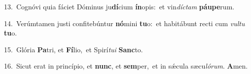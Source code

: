 {\numbfont\textcolor{\numbcolor}{13.}}~Cognóvi quia fáciet Dóminus ju\-\textbf{dí}\-cium \textbf{ín}\-opis:~\star et vin\-\textit{díc}\-\textit{tam} \textbf{páu}\-\textbf{pe}rum.\par
{\numbfont\textcolor{\numbcolor}{14.}}~Verúmtamen justi confitebúntur \textbf{nó}\-mini \textbf{tu}\-o:~\star et habitábunt recti cum \textit{vul}\-\textit{tu} \textbf{tu}\-o.\par
{\numbfont\textcolor{\numbcolor}{15.}}~Glória \textbf{Pa}\-tri, et \textbf{Fí}\-lio,~\star et Spirí\-\textit{tu}\-\textit{i} \textbf{Sanc}\-to.\par
{\numbfont\textcolor{\numbcolor}{16.}}~Sicut erat in princípio, et \textbf{nunc}\-, et \textbf{sem}\-per,~\star et in sǽcula sæcu\-\textit{ló}\-\textit{rum}. \textbf{A}\-men.\par
